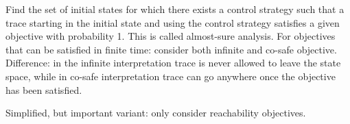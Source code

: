 Find the set of initial states for which there exists a control strategy such that a trace starting in the initial state and using the control strategy satisfies a given objective with probability 1.
This is called almost-sure analysis.
For objectives that can be satisfied in finite time: consider both infinite and co-safe objective.
Difference: in the infinite interpretation trace is never allowed to leave the state space, while in co-safe interpretation trace can go anywhere once the objective has been satisfied.

Simplified, but important variant: only consider reachability objectives.

